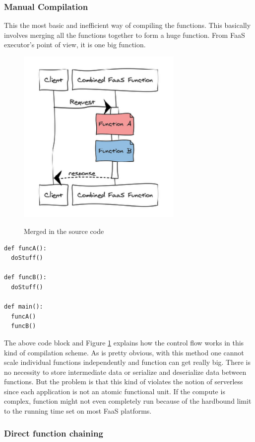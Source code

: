 \documentclass[12pt,titlepage]{article}
\begin{document}
\subsubsection{Manual Compilation}
\label{sec:orgc7dd2ec}

This the most basic and inefficient way of compiling the functions. This
basically involves merging all the functions together to form a huge function.
From FaaS executor's point of view, it is one big function.

\begin{figure}
\caption{Merged in the source code}
\centering
\includegraphics[width=80mm]{./thesis_images/manual_comp.png}
\label{fig:manual_comp}
\end{figure}

\begin{lstlisting}
def funcA():
  doStuff()

def funcB():
  doStuff()

def main():
  funcA()
  funcB()
\end{lstlisting}

The above code block and Figure \ref{fig:manual_comp} explains how the control flow works in this
kind of compilation scheme. As is pretty obvious, with this method one cannot
scale individual functions independently and function can get really big. There
is no necessity to store intermediate data or serialize and deserialize data
between functions. But the problem is that this kind of violates the notion of
serverless since each application is not an atomic functional unit. If the
compute is complex, function might not even completely run because of the
hardbound limit to the running time set on most FaaS platforms.

\subsubsection{Direct function chaining}
\label{sec:org23ae879}
\end{document}
